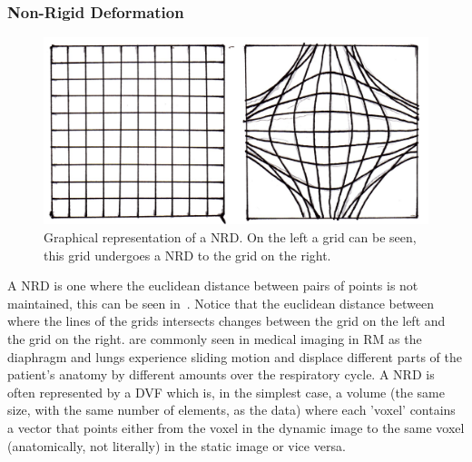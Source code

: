             \subsubsection{Non-Rigid Deformation} \label{sec:non_rigid_deformation}
                \begin{figure}
                    \centering
                    
                    \includegraphics[width=1.0\linewidth]{figures/background_nrd.png}
                    
                    \captionsetup{singlelinecheck=false, justification=raggedright}
                    \caption{Graphical representation of a \gls{NRD}. On the left a grid can be seen, this grid undergoes a \gls{NRD} to the grid on the right.} \label{fig:non_rigid_deformation_nrd}
                \end{figure}
                
                A \gls{NRD} is one where the euclidean distance between pairs of points is not maintained, this can be seen in~. Notice that the euclidean distance between where the lines of the grids intersects changes between the grid on the left and the grid on the right. %
                 are commonly seen in medical imaging in \gls{RM} as the diaphragm and lungs experience sliding motion and displace different parts of the patient's anatomy by different amounts over the respiratory cycle. A \gls{NRD} is often represented by a \gls{DVF} which is, in the simplest case, a volume (the same size, with the same number of elements, as the data) where each 'voxel' contains a vector that points either from the voxel in the dynamic image to the same voxel (anatomically, not literally) in the static image or vice versa.
                
